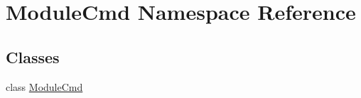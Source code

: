 \hypertarget{namespace_module_cmd}{\section{Module\-Cmd Namespace Reference}
\label{namespace_module_cmd}
}
\subsection*{Classes}
\begin{DoxyCompactItemize}
\item 
class \hyperlink{class_module_cmd_1_1_module_cmd}{Module\-Cmd}
\end{DoxyCompactItemize}
